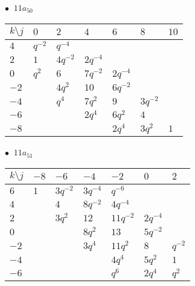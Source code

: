 \begin{minipage}{\linewidth}
$\bullet\ $ $11a_{50}$ \vspace{0.5em} \\
\begin{tabular}{l|llllll}
$k \setminus j$ & $0$ & $2$ & $4$ & $6$ & $8$ & $10$ \\
\hline
$4$ & $q^{-2}$ & $q^{-4}$ &  &  &  &  \\
$2$ & $1$ & $4q^{-2}$ & $2q^{-4}$ &  &  &  \\
$0$ & $q^{2}$ & $6$ & $7q^{-2}$ & $2q^{-4}$ &  &  \\
$-2$ &  & $4q^{2}$ & $10$ & $6q^{-2}$ &  &  \\
$-4$ &  & $q^{4}$ & $7q^{2}$ & $9$ & $3q^{-2}$ &  \\
$-6$ &  &  & $2q^{4}$ & $6q^{2}$ & $4$ &  \\
$-8$ &  &  &  & $2q^{4}$ & $3q^{2}$ & $1$ \\
\end{tabular}
\vspace{2em}
\end{minipage}
%
\begin{minipage}{\linewidth}
$\bullet\ $ $11a_{51}$ \vspace{0.5em} \\
\begin{tabular}{l|llllll}
$k \setminus j$ & $-8$ & $-6$ & $-4$ & $-2$ & $0$ & $2$ \\
\hline
$6$ & $1$ & $3q^{-2}$ & $3q^{-4}$ & $q^{-6}$ &  &  \\
$4$ &  & $4$ & $8q^{-2}$ & $4q^{-4}$ &  &  \\
$2$ &  & $3q^{2}$ & $12$ & $11q^{-2}$ & $2q^{-4}$ &  \\
$0$ &  &  & $8q^{2}$ & $13$ & $5q^{-2}$ &  \\
$-2$ &  &  & $3q^{4}$ & $11q^{2}$ & $8$ & $q^{-2}$ \\
$-4$ &  &  &  & $4q^{4}$ & $5q^{2}$ & $1$ \\
$-6$ &  &  &  & $q^{6}$ & $2q^{4}$ & $q^{2}$ \\
\end{tabular}
\vspace{2em}
\end{minipage}
%
